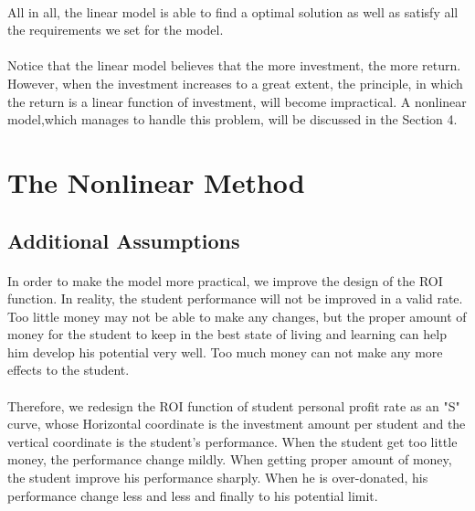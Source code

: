 \documentclass{mcmthesis}
\begin{document}
\paragraph{}All in all, the linear model is able to find a optimal solution as well as satisfy all the requirements we set for the model. 

\paragraph{}Notice that the linear model believes that the more investment, the more return. However, when the investment increases to a great extent, the principle, in which the return is a linear function of investment, will become impractical. A nonlinear model,which manages to handle this problem, will be discussed in the Section 4. 

\section{The Nonlinear Method} 

\subsection{Additional Assumptions}

\paragraph{} In order to make the model more practical, we improve the design of the ROI function. In reality, the student performance will not be improved in a valid rate. Too little money may not be able to make any changes, but the proper amount of money for the student to keep in the best state of living and learning can help him develop his potential very well. Too much money can not make any more effects to the student.
\paragraph{} Therefore, we redesign the ROI function of student personal profit rate as an "S" curve, whose Horizontal coordinate is the investment amount per student and the vertical coordinate is the student's performance. When the student get too little money, the performance change mildly. When getting proper amount of money, the student improve his performance sharply. When he is over-donated, his performance change less and less and finally to his potential limit.
\end{document}
